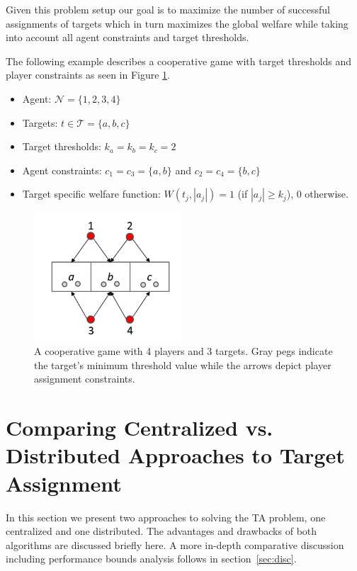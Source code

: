 \documentclass[11pt, onecolumn, compsoc, letterpaper]{article}
\newcommand{\Pl}{\mathcal{N}} %
\newcommand{\Ta}{\mathcal{T}} %
\begin{document}
Given this problem setup our goal is to maximize the number of successful assignments of targets which in turn maximizes the global welfare while taking into account all agent constraints and target thresholds.

The following example describes a cooperative game with target thresholds and player constraints as seen in Figure \ref{fig:ex1}.
\begin{itemize}
	\item Agent: $\Pl = \{1,2,3,4\}$
	\item Targets: $t \in \Ta = \{a, b, c\}$
	\item Target thresholds: $k_a = k_b = k_c = 2$
	\item Agent constraints: $c_1 = c_3 = \{a, b\}$ and $c_2 = c_4 = \{b, c\}$
	\item Target specific welfare function: $W(t_j, |a_j|) = 1$ (if $|a_j| \geq k_j$), $0$ otherwise.
	
\end{itemize}
\begin{figure}[!htb]
	\centering\includegraphics[width=5.5cm]{assets/ex1.png}
	\centering\caption{A cooperative game with 4 players and 3 targets. Gray pegs indicate the target's minimum threshold value while the arrows depict player assignment constraints.}\label{fig:ex1}
\end{figure}

\section{Comparing Centralized vs. Distributed Approaches to Target Assignment}
In this section we present two approaches to solving the TA problem, one centralized and one distributed. The advantages and drawbacks of both algorithms are discussed briefly here. A more in-depth comparative discussion including performance bounds analysis follows in section~\ref{sec:disc}.
\end{document}

